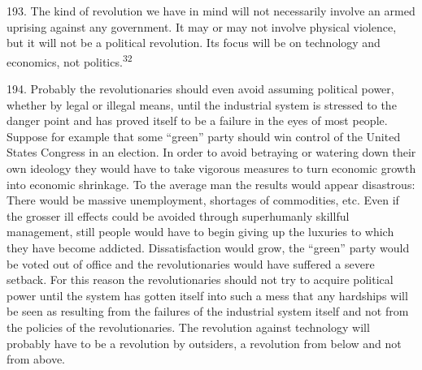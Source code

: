 \documentclass{article}
\begin{document}
193. The kind of revolution we have in mind will not necessarily involve an armed uprising 
against any government. It may or may not involve physical violence, but it will not be a political 
revolution. Its focus will be on technology and economics, not politics.\textsuperscript{32} \vspace{\baselineskip}

194. Probably the revolutionaries should even avoid assuming political power, whether by legal 
or illegal means, until the industrial system is stressed to the danger point and has proved itself to 
be a failure in the eyes of most people. Suppose for example that some “green” party should win 
control of the United States Congress in an election. In order to avoid betraying or watering down 
their own ideology they would have to take vigorous measures to turn economic growth into
economic shrinkage. To the average man the results would appear disastrous: There would be 
massive unemployment, shortages of commodities, etc. Even if the grosser ill effects could be 
avoided through superhumanly skillful management, still people would have to begin giving up 
the luxuries to which they have become addicted. Dissatisfaction would grow, the “green” party 
would be voted out of office and the revolutionaries would have suffered a severe setback. For 
this reason the revolutionaries should not try to acquire political power until the system has gotten 
itself into such a mess that any hardships will be seen as resulting from the failures of the industrial 
system itself and not from the policies of the revolutionaries. The revolution against technology 
will probably have to be a revolution by outsiders, a revolution from below and not from above. \vspace{\baselineskip}
\end{document}
